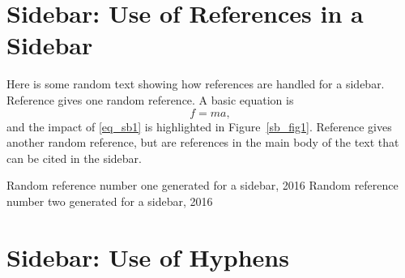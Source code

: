 \documentclass[letterpaper,12pt,peerreviewca,draftcls]{IEEEtran}
\newcommand{\be}{\begin{equation}}\newcommand{\ee}{\end{equation}}
\begin{document}
\processdelayedfloats %

\sidebars %

\clearpage
\newpage

\section[Use of References in a Sidebar]{Sidebar: Use of References in a Sidebar}
\label{sb:UseofRefs}
Here is some random text showing how references are handled for a sidebar. 
Reference \cite{S1} gives one random reference. A basic equation is
\be f=ma, \label{eq_sb1}
\ee
and the impact of \eqref{eq_sb1} is highlighted in Figure~\ref{sb_fig1}. Reference \cite{S2} gives another random reference, but \cite{LT,BIB} are references in the main body of the text that can be cited in the sidebar.


\begin{thebibliography}{10}
	 Random reference number one generated for a sidebar, 2016
	 Random reference number two generated for a sidebar, 2016
\end{thebibliography}

\newpage
\processdelayedfloats %
\clearpage


\clearpage
\section[Use of Hyphens]{Sidebar: Use of Hyphens}
\label{sb:UseofHyphens}
       			
\end{document}
